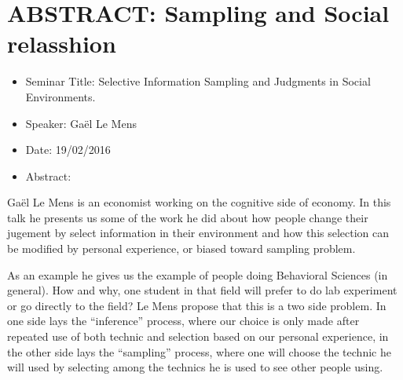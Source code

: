 \documentclass[10pt,letterpaper]{article}
\begin{document}
%
%
%
%
%


\section{ABSTRACT: Sampling and Social relasshion}
\begin{itemize}
    \item Seminar Title: Selective Information Sampling and Judgments in Social Environments.
    \item Speaker: Ga\"el Le Mens
    \item Date: 19/02/2016
    \item Abstract:
\end{itemize}
Ga\"el Le Mens is an economist working on the cognitive side of economy. In this talk he presents us some of the work he did about how people change their jugement by select information in their environment and how this selection can be modified by personal experience, or biased toward sampling problem. 

As an example he gives us the example of people doing Behavioral Sciences (in general). How and why, one student in that field will prefer to do lab experiment or go directly to the field? Le Mens propose that this is a two side problem. In one side lays the ``inference'' process, where our choice is only made after repeated use of both technic and selection based on our personal experience, in the other side lays the ``sampling'' process, where one will choose the technic he will used by selecting among the technics he is used to see other people using. 
\end{document}
